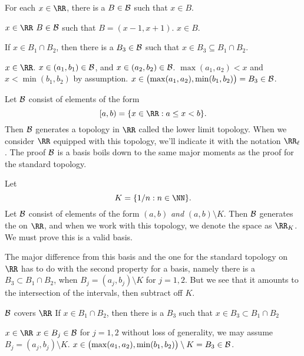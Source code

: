\begin{spf}
  \step For each $x\in\RR$, there is a $B\in\mathcal{B}$ such that
  $x\in B$.
  \begin{spf}
    \Let $x\in\RR$
    \ThenConsider $B\in\mathcal{B}$ such that $B=(x-1,x+1)$.
    \Hence $x\in B$.
  \end{spf}
  \step If $x\in B_{1}\cap B_{2}$, then there is a
  $B_{3}\in\mathcal{B}$ such that $x\in B_{3}\subseteq B_{1}\cap
  B_{2}$.
  \begin{spf}
    \Let $x\in\RR$.
    \Assume $x\in (a_{1},b_{1})\in\mathcal{B}$, and $x\in
    (a_{2},b_{2})\in\mathcal{B}$.
    \Then $\max(a_{1},a_{2})<x$ and $x<\min(b_{1},b_{2})$ by assumption.
    \Hence $x\in\bigl(\max(a_{1},a_{2}), \min(b_{1},b_{2})\bigr)=B_{3}\in\mathcal{B}$.\placeQED
  \end{spf}
\end{spf}

Let $\mathcal{B}$ consist of elements of the form
\begin{equation}
  [a,b) = \{x\in\RR : a\leq x<b\}.
\end{equation}
Then $\mathcal{B}$ generates a topology in $\RR$ called the lower limit
topology. When we consider $\RR$ equipped with this topology, we'll
indicate it with the notation $\lowerlimRR$. The proof $\mathcal{B}$ is
a basis boils down to the same major moments as the proof for the
standard topology.

Let
\begin{equation}
  K = \{1/n : n\in\NN\}.
\end{equation}
Let $\mathcal{B}$ consist of elements of the form $(a,b)$ \emph{and}
$(a,b)\setminus K$. Then $\mathcal{B}$ generates the
 on $\RR$, and when we work with this topology, we
denote the space as $\RR_{K}$. We must prove this is a valid basis.

\begin{pfSketch}
  The major difference from this basis and the one for the standard
  topology on $\RR$ has to do with the second property for a basis,
  namely there is a $B_{3}\subset B_{1}\cap B_{2}$, when
  $B_{j}=(a_{j},b_{j})\setminus K$ for $j=1,2$. But we see that it
  amounts to the intersection of the intervals, then subtract off $K$.
\end{pfSketch}
\begin{spf}
  \step $\mathcal{B}$ covers $\RR$
  \step If $x\in B_{1}\cap B_{2}$, then there is a $B_{3}$ such that
  $x\in B_{3}\subset B_{1}\cap B_{2}$
  \begin{spf}
    \Let $x\in\RR$
    \Assume $x\in B_{j}\in\mathcal{B}$ for $j=1,2$
    \Then without loss of generality, we may assume
    $B_{j}=(a_{j},b_{j})\setminus K$.
    \Hence $x\in\bigl(\max(a_{1},a_{2}), \min(b_{1},b_{2})\bigr)\setminus K=B_{3}\in\mathcal{B}$.\placeQED
  \end{spf}
\end{spf}

